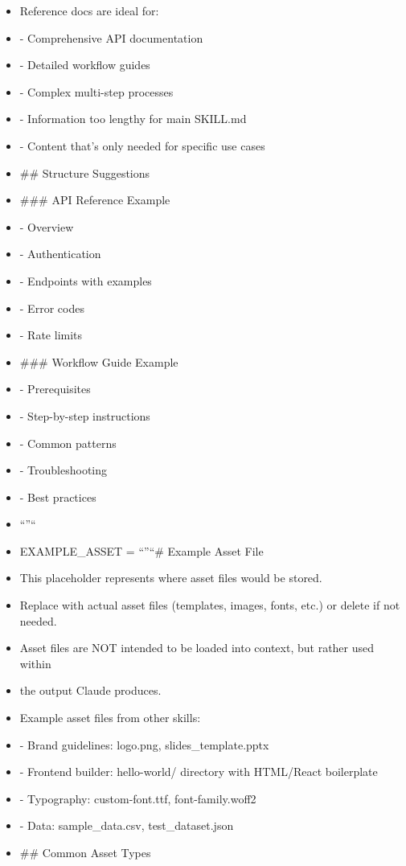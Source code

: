 \documentclass[11pt]{article}
\begin{document}
\begin{itemize}[leftmargin=*,itemsep=2pt,topsep=2pt]
\item {} Reference docs are ideal for:
\item {} - Comprehensive API documentation
\item {} - Detailed workflow guides
\item {} - Complex multi-step processes
\item {} - Information too lengthy for main SKILL.md
\item {} - Content that's only needed for specific use cases
\item {} \#\# Structure Suggestions
\item {} \#\#\# API Reference Example
\item {} - Overview
\item {} - Authentication
\item {} - Endpoints with examples
\item {} - Error codes
\item {} - Rate limits
\item {} \#\#\# Workflow Guide Example
\item {} - Prerequisites
\item {} - Step-by-step instructions
\item {} - Common patterns
\item {} - Troubleshooting
\item {} - Best practices
\item {} ``''``
\item {} EXAMPLE\_\allowbreak{}ASSET = ``''``\# Example Asset File
\item {} This placeholder represents where asset files would be stored.
\item {} Replace with actual asset files (templates, images, fonts, etc.) or delete if not needed.
\item {} Asset files are NOT intended to be loaded into context, but rather used within
\item {} the output Claude produces.
\item {} Example asset files from other skills:
\item {} - Brand guidelines: logo.png, slides\_\allowbreak{}template.pptx
\item {} - Frontend builder: hello-world/ directory with HTML/React boilerplate
\item {} - Typography: custom-font.ttf, font-family.woff2
\item {} - Data: sample\_\allowbreak{}data.csv, test\_\allowbreak{}dataset.json
\item {} \#\# Common Asset Types

\end{itemize}
\end{document}
